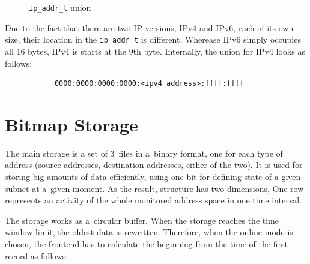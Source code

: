 \begin{figure}[H]
   \begin{center}
		 \hfill
      \caption{\texttt{ip\_addr\_t} union} \label{fig:ip_addr_t}
	\end{center}
\end{figure}

Due to the fact that there are two IP versions, IPv4 and IPv6, each of its own size,
their location in the \texttt{ip\_addr\_t} is different. Wherease IPv6 simply occupies
all 16 bytes, IPv4 is starts at the 9th byte. Internally, the union for IPv4 looks as follows:

\begin{figure}[H]
\begin{center}
   \begin{lstlisting}
      0000:0000:0000:0000:<ipv4 address>:ffff:ffff
   \end{lstlisting}
\end{center}
\end{figure}


\section{Bitmap Storage}\label{sec:bitmap_storage}
The main storage is a set of 3~files in a~binary format, one for each type of address
(source addresses, destination addresses, either of the two). It is used for storing big
amounts of data efficiently, using one bit for defining state of a given subnet
at a~given moment. As the result, structure has two dimensions, One row represents an
activity of the whole monitored address space in one time interval.

The storage works as a~circular buffer. When the storage reaches the time window limit,
the oldest data is rewritten. Therefore, when the online mode is chosen, the frontend
has to calculate the beginning from the time of the first record as follows:

